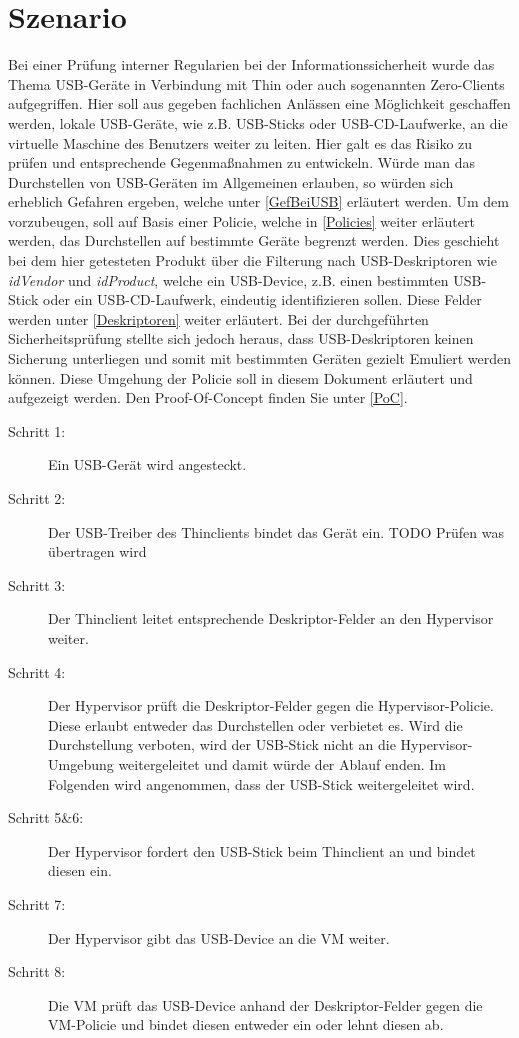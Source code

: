 			\chapter{Szenario}
Bei einer Prüfung interner Regularien bei der Informationssicherheit wurde das Thema USB-Geräte in Verbindung mit Thin oder auch sogenannten Zero-Clients aufgegriffen. Hier soll aus gegeben fachlichen Anlässen eine Möglichkeit geschaffen werden, lokale USB-Geräte, wie z.B. USB-Sticks oder USB-CD-Laufwerke, an die virtuelle Maschine des Benutzers weiter zu leiten. Hier galt es das Risiko zu prüfen und entsprechende Gegenmaßnahmen zu entwickeln. 
Würde man das Durchstellen von USB-Geräten im Allgemeinen erlauben, so würden sich erheblich Gefahren ergeben, welche unter \ref{GefBeiUSB} erläutert werden. Um dem vorzubeugen, soll auf Basis einer Policie, welche in \ref{Policies} weiter erläutert werden, das Durchstellen auf bestimmte Geräte begrenzt werden. Dies geschieht bei dem hier getesteten Produkt über die Filterung nach USB-Deskriptoren wie \textit{idVendor} und \textit{idProduct}, welche ein USB-Device, z.B. einen bestimmten USB-Stick oder ein USB-CD-Laufwerk, eindeutig identifizieren sollen. Diese Felder werden unter \ref{Deskriptoren} weiter erläutert.
Bei der durchgeführten Sicherheitsprüfung stellte sich jedoch heraus, dass USB-Deskriptoren keinen Sicherung unterliegen und somit mit bestimmten Geräten gezielt Emuliert werden können. Diese Umgehung der Policie soll in diesem Dokument erläutert und aufgezeigt werden. Den Proof-Of-Concept finden Sie unter \ref{PoC}.



\begin{description}
	\item[Schritt 1: ] Ein USB-Gerät wird angesteckt.
	\item[Schritt 2: ] Der USB-Treiber des Thinclients bindet das Gerät ein. TODO Prüfen was übertragen wird
	\item[Schritt 3: ] Der Thinclient leitet entsprechende Deskriptor-Felder an den Hypervisor weiter.
	\item[Schritt 4: ] Der Hypervisor prüft die Deskriptor-Felder gegen die Hypervisor-Policie. Diese erlaubt entweder das Durchstellen oder verbietet es. Wird die Durchstellung verboten, wird der USB-Stick nicht an die Hypervisor-Umgebung weitergeleitet und damit würde der Ablauf enden. Im Folgenden wird angenommen, dass der USB-Stick weitergeleitet wird.
	\item[Schritt 5\&6: ] Der Hypervisor fordert den USB-Stick beim Thinclient an und bindet diesen ein.
	\item[Schritt 7: ] Der Hypervisor gibt das USB-Device an die VM weiter.
	\item[Schritt 8: ] Die VM prüft das USB-Device anhand der Deskriptor-Felder gegen die VM-Policie und bindet diesen entweder ein oder lehnt diesen ab.
\end{description}